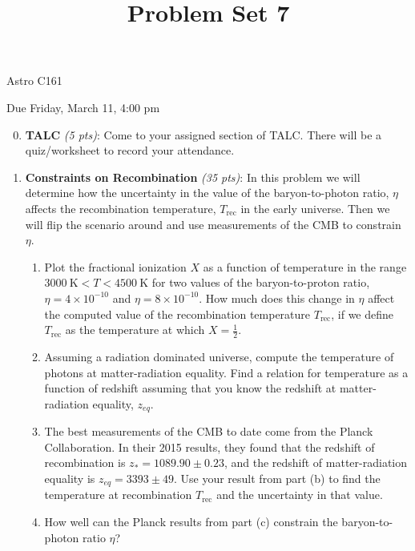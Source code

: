 \documentclass[12pt,preprint]{aastex}
\title{Problem Set 7}
\def\K{\mathrm{K}}
\newcommand\sn[2]{#1 \times 10^{#2}}
\def\half{\frac{1}{2}}
\def\Trec{T_{\mathrm{rec}}}
\begin{document}
\maketitle
\centerline{Astro C161} 

\centerline{Due Friday, March 11, 4:00 pm}

\begin{enumerate}
\setcounter{enumi}{-1}

\item \textbf{TALC} \textit{(5 pts)}: Come to your assigned section of TALC. There will be a quiz/worksheet to record your attendance.

\item \textbf{Constraints on Recombination} \textit{(35 pts)}: In this problem we will determine how the uncertainty in the value of the baryon-to-photon ratio, $\eta$ affects the recombination temperature, $\Trec$ in the early universe. Then we will flip the scenario around and use measurements of the CMB to constrain $\eta$. 
	\begin{enumerate}
	\item Plot the fractional ionization $X$ as a function of temperature in the range $3000\ \K < T < 4500\ \K$ for two values of the baryon-to-proton ratio, $\eta = \sn{4}{-10}$ and $\eta = \sn{8}{-10}$. How much does this change in $\eta$ affect the computed value of the recombination temperature $\Trec$, if we define $\Trec$ as the temperature at which $X = \half$. 
	\item Assuming a radiation dominated universe, compute the temperature of photons at matter-radiation equality. Find a relation for temperature as a function of redshift assuming that you know the redshift at matter-radiation equality, $z_{eq}$. 
	\item The best measurements of the CMB to date come from the Planck Collaboration. In their 2015 results, they found that the redshift of recombination is $z_* = 1089.90 \pm 0.23$, and the redshift of matter-radiation equality is $z_{eq} =  3393 \pm 49$. Use your result from part (b) to find the temperature at recombination $\Trec$ and the uncertainty in that value. 
	\item How well can the Planck results from part (c) constrain the baryon-to-photon ratio $\eta$?
	\end{enumerate}


\end{enumerate}
\end{document}

